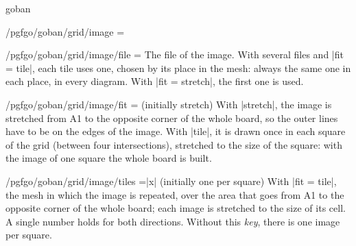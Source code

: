 \begin{environment}{{goban}}
\begin{key}{/pgfgo/goban/grid/image =}
\begin{codeexample}[]
			\begin{goban}[9, grid = {image = {file = pgfgo-grid.png}}, hoshi = false, partial = C3:G7]
			\end{goban}
		\end{codeexample}
	\end{key}

	\begin{key}{/pgfgo/goban/grid/image/file =}
		The file of the image. With several files and |fit = tile|, each tile uses one, chosen by its place in the mesh: always the same one in each place, in every diagram. With |fit = stretch|, the first one is used.

		\begin{codeexample}[]
			\begin{goban}[5, hoshi = false,
				grid = {image = {file = {pgfgo-cell.png, pgfgo-tile.png}, fit = tile}}]
			\end{goban}
		\end{codeexample}
	\end{key}

	\begin{key}{/pgfgo/goban/grid/image/fit = (initially stretch)}
		With |stretch|, the image is stretched from A1 to the opposite corner of the whole board, so the outer lines have to be on the edges of the image. With |tile|, it is drawn once in each square of the grid (between four intersections), stretched to the size of the square: with the image of one square the whole board is built.

		\begin{codeexample}[]
			\begin{goban}[9, grid = {image = {file = pgfgo-cell.png, fit = tile}}, hoshi = false]
			\end{goban}
		\end{codeexample}
	\end{key}

	\begin{key}{/pgfgo/goban/grid/image/tiles =|x| (initially one per square)}
		With |fit = tile|, the mesh in which the image is repeated, over the area that goes from A1 to the opposite corner of the whole board; each image is stretched to the size of its cell. A single number holds for both directions. Without this \emph{key}, there is one image per square.

		\begin{codeexample}[]
			\begin{goban}[9, grid = {image = {file = pgfgo-cell.png, fit = tile, tiles = 4}}, hoshi = false]
			\end{goban}
		\end{codeexample}
	\end{key}


\end{environment}

